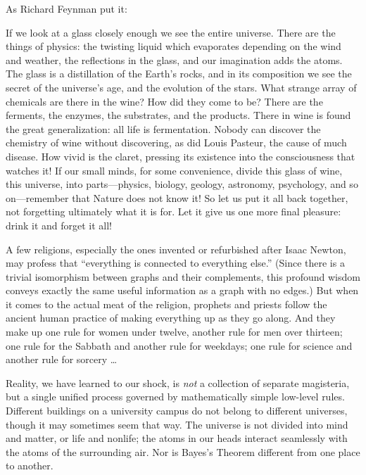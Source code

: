 {
 As Richard Feynman put it:}

{
 If we look at a glass closely enough we see the entire universe.
There are the things of physics: the twisting liquid which evaporates
depending on the wind and weather, the reflections in the glass, and
our imagination adds the atoms. The glass is a distillation of the
Earth's rocks, and in its composition we see the secret
of the universe's age, and the evolution of the stars.
What strange array of chemicals are there in the wine? How did they
come to be? There are the ferments, the enzymes, the substrates, and
the products. There in wine is found the great generalization: all life
is fermentation. Nobody can discover the chemistry of wine without
discovering, as did Louis Pasteur, the cause of much disease. How vivid
is the claret, pressing its existence into the consciousness that
watches it! If our small minds, for some convenience, divide this glass
of wine, this universe, into parts---physics, biology, geology,
astronomy, psychology, and so on---remember that Nature does not know
it! So let us put it all back together, not forgetting ultimately what
it is for. Let it give us one more final pleasure: drink it and forget
it all!}

{
 A few religions, especially the ones invented or refurbished after
Isaac Newton, may profess that ``everything is
connected to everything else.'' (Since there is a
trivial isomorphism between graphs and their complements, this profound
wisdom conveys exactly the same useful information as a graph with no
edges.) But when it comes to the actual meat of the religion, prophets
and priests follow the ancient human practice of making everything up
as they go along. And they make up one rule for women under twelve,
another rule for men over thirteen; one rule for the Sabbath and
another rule for weekdays; one rule for science and another rule for
sorcery \ldots}

{
 Reality, we have learned to our shock, is \textit{not} a
collection of separate magisteria, but a single unified process
governed by mathematically simple low-level rules. Different buildings
on a university campus do not belong to different universes, though it
may sometimes seem that way. The universe is not divided into mind and
matter, or life and nonlife; the atoms in our heads interact seamlessly
with the atoms of the surrounding air. Nor is Bayes's
Theorem different from one place to another.}

